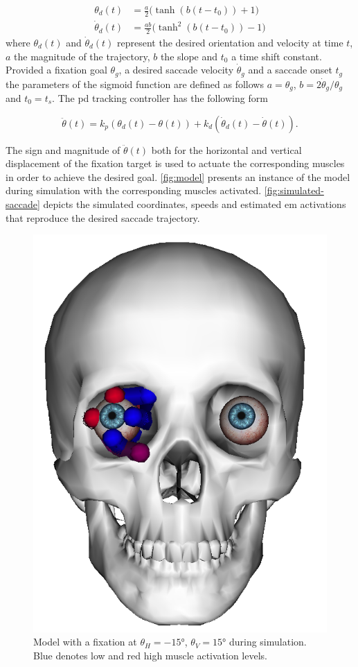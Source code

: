 \documentclass[11pt,a4paper,draft=false]{report}
\begin{document}
\begin{equation}\label{equ:sigmoid}
  \begin{aligned}
    \theta_d(t) &= \frac{a}{2} \Big(\tanh(b (t - t_0)) + 1\Big) \\
    \dot{\theta}_d(t) &= \frac{a b}{2} \Big(\tanh^2(b (t - t_0)) - 1\Big)
  \end{aligned}
\end{equation}
% 
where $\theta_d(t)$ and $\dot{\theta}_d(t)$ represent the desired orientation
and velocity at time $t$, $a$ the magnitude of the trajectory, $b$ the slope and
$t_0$ a time shift constant. Provided a fixation goal $\theta_g$, a desired
saccade velocity $\dot{\theta}_g$ and a saccade onset $t_g$ the parameters of
the sigmoid function are defined as follows $a = \theta_g$,
$b = 2 \dot{\theta}_g / \theta_g$ and $t_0 = t_s$. The \gls{pd} tracking
controller has the following form

\begin{equation}\label{equ:pd-controller}
  \ddot{\theta}(t) = k_p (\theta_d(t) - \theta(t)) + k_d (\dot{\theta}_d(t) -
  \dot{\theta}(t)).
\end{equation}

The sign and magnitude of $\ddot{\theta}(t)$ both for the horizontal and
vertical displacement of the fixation target is used to actuate the
corresponding muscles in order to achieve the desired goal. \autoref{fig:model}
presents an instance of the model during simulation with the corresponding
muscles activated. \autoref{fig:simulated-saccade} depicts the simulated
coordinates, speeds and estimated \gls{em} activations that reproduce the
desired saccade trajectory.

\begin{figure}[ht]
  \centering
  \includegraphics[width=.7\textwidth]{eye-model.png}
  \caption{Model with a fixation at $\theta_H = -15 \si{\degree}$,
    $\theta_V = 15 \si{\degree}$ during simulation. Blue denotes low and red high
    muscle activation levels.}\label{fig:model}
\end{figure}
\end{document}
